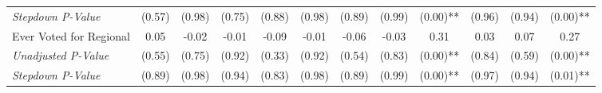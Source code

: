 \begin{tabular}{l c c c c c c c c c c c}
\quad \textit{Stepdown P-Value} & (0.57) & (0.98) & (0.75) & (0.88) & (0.98) & (0.89) & (0.99) & (0.00)** & (0.96) & (0.94) & (0.00)** \\
Ever Voted for Regional & 0.05 & -0.02 & -0.01 & -0.09 & -0.01 & -0.06 & -0.03 & 0.31 & 0.03 & 0.07 & 0.27 \\
\quad \textit{Unadjusted P-Value} & (0.55) & (0.75) & (0.92) & (0.33) & (0.92) & (0.54) & (0.83) & (0.00)** & (0.84) & (0.59) & (0.00)** \\
\quad \textit{Stepdown P-Value} & (0.89) & (0.98) & (0.94) & (0.83) & (0.98) & (0.89) & (0.99) & (0.00)** & (0.97) & (0.94) & (0.01)** \\
\bottomrule
\end{tabular}
